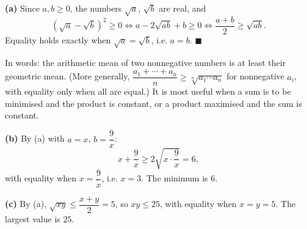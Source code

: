 \textbf{(a)} Since $a,b\ge0$, the numbers $\sqrt a$, $\sqrt b$ are real, and
\[\left(\sqrt a-\sqrt b\right)^2\ge0\iff a-2\sqrt{ab}+b\ge0\iff\dfrac{a+b}2\ge\sqrt{ab}.\]
Equality holds exactly when $\sqrt a=\sqrt b$, i.e. $a=b$. $\blacksquare$

In words: the arithmetic mean of two nonnegative numbers is at least their geometric mean. (More generally, $\dfrac{a_1+\cdots+a_n}{n}\ge\sqrt[n]{a_1\cdots a_n}$ for nonnegative $a_i$, with equality only when all are equal.) It is most useful when a sum is to be minimised and the product is constant, or a product maximised and the sum is constant.

\textbf{(b)} By (a) with $a=x$, $b=\dfrac9x$:
\[x+\dfrac9x\ge2\sqrt{x\cdot\dfrac9x}=6,\]
with equality when $x=\dfrac9x$, i.e. $x=3$. The minimum is $\boxed{6}$.

\textbf{(c)} By (a), $\sqrt{xy}\le\dfrac{x+y}{2}=5$, so $xy\le25$, with equality when $x=y=5$. The largest value is $\boxed{25}$.
